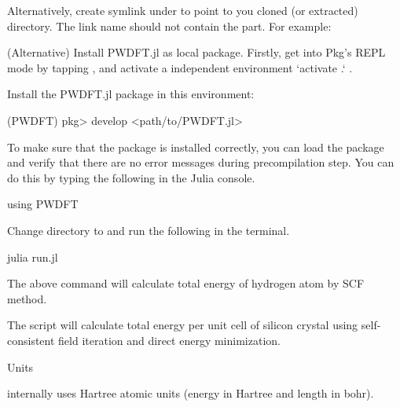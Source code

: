 Alternatively, create symlink under 
to point to you cloned (or extracted)  directory.
The link name should not contain the  part. For example:


(Alternative) Install PWDFT.jl as local package.
Firstly, get into Pkg's REPL mode by tapping \jlinline{]},
and activate a independent environment `activate .` .

Install the PWDFT.jl package in this environment:

\begin{textcode}
(PWDFT) pkg> develop <path/to/PWDFT.jl>
\end{textcode}

To make sure that the package is installed correctly, you can load the package
and verify that there are no error messages during precompilation step.
You can do this by typing the following in the Julia console.

\begin{juliacode}
using PWDFT
\end{juliacode}


Change directory to  and run the following in the terminal.

\begin{textcode}
julia run.jl
\end{textcode}

The above command will calculate total energy of hydrogen atom by SCF method.

The script will calculate total energy per unit cell of silicon crystal using
self-consistent field iteration and direct energy minimization.

Units

 internally uses Hartree atomic
units (energy in Hartree and length in bohr).


